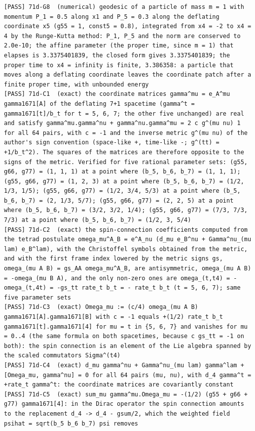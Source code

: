 \documentclass[
  10pt,
]{article}
\begin{document}
\begin{verbatim}
[PASS] 71d-G8  (numerical) geodesic of a particle of mass m = 1 with momentum P_1 = 0.5 along x1 and P_5 = 0.3 along the deflating coordinate x5 (g55 = 1, const5 = 0.8), integrated from x4 = -2 to x4 = 4 by the Runge-Kutta method: P_1, P_5 and the norm are conserved to 2.0e-10; the affine parameter (the proper time, since m = 1) that elapses is 3.3375401839, the closed form gives 3.3375401839; the proper time to x4 = infinity is finite, 3.386358: a particle that moves along a deflating coordinate leaves the coordinate patch after a finite proper time, with unbounded energy
[PASS] 71d-C1  (exact) the coordinate matrices gamma^mu = e_A^mu gamma1671[A] of the deflating 7+1 spacetime (gamma^t = gamma1671[t]/b_t for t = 5, 6, 7; the other five unchanged) are real and satisfy gamma^mu.gamma^nu + gamma^nu.gamma^mu = 2 c g^(mu nu) 1 for all 64 pairs, with c = -1 and the inverse metric g^(mu nu) of the author's sign convention (space-like +, time-like -; g^(tt) = +1/b_t^2). The squares of the matrices are therefore opposite to the signs of the metric. Verified for five rational parameter sets: (g55, g66, g77) = (1, 1, 1) at a point where (b_5, b_6, b_7) = (1, 1, 1); (g55, g66, g77) = (1, 2, 3) at a point where (b_5, b_6, b_7) = (1/2, 1/3, 1/5); (g55, g66, g77) = (1/2, 3/4, 5/3) at a point where (b_5, b_6, b_7) = (2, 1/3, 5/7); (g55, g66, g77) = (2, 2, 5) at a point where (b_5, b_6, b_7) = (3/2, 3/2, 1/4); (g55, g66, g77) = (7/3, 7/3, 7/3) at a point where (b_5, b_6, b_7) = (1/2, 3, 5/4)
[PASS] 71d-C2  (exact) the spin-connection coefficients computed from the tetrad postulate omega_mu^A_B = e^A_nu (d_mu e_B^nu + Gamma^nu_(mu lam) e_B^lam), with the Christoffel symbols obtained from the metric, and with the first frame index lowered by the metric signs gs, omega_(mu A B) = gs_AA omega_mu^A_B, are antisymmetric, omega_(mu A B) = -omega_(mu B A), and the only non-zero ones are omega_(t,t4) = -omega_(t,4t) = -gs_tt rate_t b_t = - rate_t b_t (t = 5, 6, 7); same five parameter sets
[PASS] 71d-C3  (exact) Omega_mu := (c/4) omega_(mu A B) gamma1671[A].gamma1671[B] with c = -1 equals +(1/2) rate_t b_t gamma1671[t].gamma1671[4] for mu = t in {5, 6, 7} and vanishes for mu = 0..4 (the same formula on both spacetimes, because c gs_tt = -1 on both): the spin connection is an element of the Lie algebra spanned by the scaled commutators Sigma^(t4)
[PASS] 71d-C4  (exact) d_mu gamma^nu + Gamma^nu_(mu lam) gamma^lam + [Omega_mu, gamma^nu] = 0 for all 64 pairs (mu, nu), with d_4 gamma^t = +rate_t gamma^t: the coordinate matrices are covariantly constant
[PASS] 71d-C5  (exact) sum_mu gamma^mu.Omega_mu = -(1/2) (g55 + g66 + g77) gamma1671[4]: in the Dirac operator the spin connection amounts to the replacement d_4 -> d_4 - gsum/2, which the weighted field psihat = sqrt(b_5 b_6 b_7) psi removes

\end{verbatim}
\end{document}
